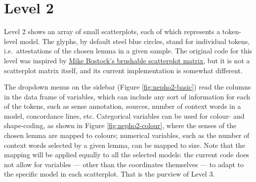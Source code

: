 \documentclass[
]{book}
\begin{document}
\hypertarget{nepho2}{%
\section{Level 2}\label{nepho2}}

Level 2 shows an array of small scatterplots, each of which represents a token-level model. The glyphs, by default steel blue circles, stand for individual tokens, i.e.~attestations of the chosen lemma in a given sample. The original code for this level was inspired by \href{https://bl.ocks.org/mbostock/3213173}{Mike Bostock's brushable scatterplot matrix}, but it is not a scatterplot matrix itself, and its current implementation is somewhat different.

The dropdown menus on the sidebar (Figure \ref{fig:nepho2-basic}) read the columns in the data frame of variables, which can include any sort of information for each of the tokens, such as sense annotation, sources, number of context words in a model, concordance lines, etc. Categorical variables can be used for colour- and shape-coding, as shown in Figure \ref{fig:nepho2-colour}, where the senses of the chosen lemma are mapped to colours; numerical variables, such as the number of context words selected by a given lemma, can be mapped to size. Note that the mapping will be applied equally to all the selected models: the current code does not allow for variables --- other than the coordinates themselves --- to adapt to the specific model in each scatterplot. That is the purview of Level 3.
\end{document}
